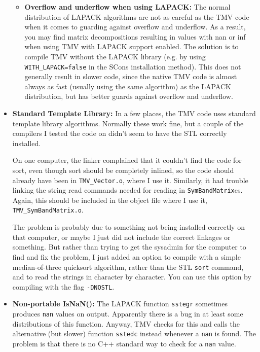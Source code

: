 \documentclass[twoside,letterpaper,11pt]{article}
\renewcommand{\tt}[1]{{\lstinline {#1}}}
\begin{document}
\begin{itemize}
\begin{itemize}
\item {\bf Overflow and underflow when using LAPACK:}
The normal distribution of LAPACK algorithms are not as careful as the TMV code when 
it comes to guarding against overflow and underflow.  As a result, you may find
matrix decompositions resulting in values with nan or inf when using TMV
with LAPACK support enabled.  The solution is to compile TMV without the LAPACK
library (e.g. by using \tt{WITH_LAPACK=false} in the SCons installation method).
This does not generally result in slower code, since the native TMV code is almost always
as fast (usually using the same algorithm) as the LAPACK distribution, but has better
guards against overflow and underflow.

\end{itemize}

\item {\bf Standard Template Library:}
In a few places, the TMV code uses standard template library algorithms.
Normally these work fine, but a couple of the compilers I tested the code on
didn't seem to have the STL correctly installed. 

On one computer, the linker complained 
that it couldn't find the code for sort, even though sort should be completely inlined,
so the code should already have been in \texttt{TMV\_Vector.o}, where I use it.
Similarly, it had trouble linking the string read commands needed for reading
in \tt{SymBandMatrix}es.  Again, this should be included in the object file where 
I use it, \texttt{TMV\_SymBandMatrix.o}.

The problem is probably due to something not being installed correctly on that
computer, or maybe I just did not include the correct linkages or something.  
But rather than trying to get the sysadmin for the computer to find and fix the problem, 
I just added an option to compile with a simple median-of-three
quicksort algorithm, rather than the STL \tt{sort} command, and to read the strings
in character by character.  You can use this option by compiling with the 
flag \texttt{-DNOSTL}.  

\item {\bf Non-portable IsNaN():}
The LAPACK function \tt{sstegr} sometimes produces \tt{nan} values on output.
Apparently there is a bug in at least some distributions of this function.
Anyway, TMV checks for this and calls the alternative (but slower) function
\tt{sstedc} instead whenever a \tt{nan} is found.  
The problem is that there is no C++ standard way to check
for a \tt{nan} value.  


\end{itemize}
\end{document}
